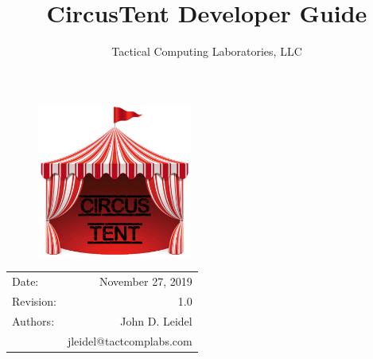 \documentclass{article}
\title{CircusTent Developer Guide} %
\author{Tactical Computing Laboratories, LLC} %
\date{} %
\begin{document}
\begin{figure}
\begin{center}
\includegraphics[width=2in]{figures/circus_tent.png} %
\end{center}
\end{figure}

\maketitle %
\thispagestyle{fancy} %

\begin{center}
\begin{tabular}{l r}
Date: & November 27, 2019 \\ %
Revision: & 1.0 \\         %
Authors: & John D. Leidel\\ %
& jleidel@tactcomplabs.com\\
\end{tabular}
\end{center}



\clearpage
\tableofcontents
\clearpage


\clearpage
\listoffigures
\lstlistoflistings
\listoftables
\clearpage
\end{document}
